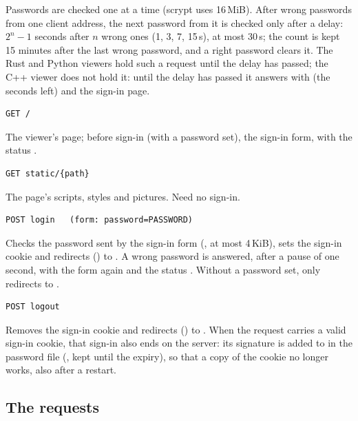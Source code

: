 Passwords are checked one at a time (scrypt uses 16\,MiB). After wrong passwords from one client
address, the next password from it is checked only after a delay: $2^n-1$ seconds after $n$
wrong ones (1, 3, 7, 15\,s), at most 30\,s; the count is kept 15 minutes after the last wrong
password, and a right password clears it. The Rust and Python viewers hold such a request until
the delay has passed; the C++ viewer does not hold it: until the delay has passed it answers
 with  (the seconds left) and the sign-in page.

\begin{lstlisting}[style=signature]
GET /
\end{lstlisting}
The viewer's page; before sign-in (with a password set), the sign-in form, with the status
.

\begin{lstlisting}[style=signature]
GET static/{path}
\end{lstlisting}
The page's scripts, styles and pictures. Need no sign-in.

\begin{lstlisting}[style=signature]
POST login   (form: password=PASSWORD)
\end{lstlisting}
Checks the password sent by the sign-in form (, at
most 4\,KiB), sets
the sign-in cookie and redirects () to . A wrong password is answered, after
a pause of one second, with the form again and the status . Without a password set,
only redirects to .

\begin{lstlisting}[style=signature]
POST logout
\end{lstlisting}
Removes the sign-in cookie and redirects () to . When the request carries a
valid sign-in cookie, that sign-in also ends on the server: its signature is added to
 in the password file (, kept until the
expiry), so that a copy of the cookie no longer works, also after a restart.

\subsection{The requests}
\label{sec:viewer-api-requests}

